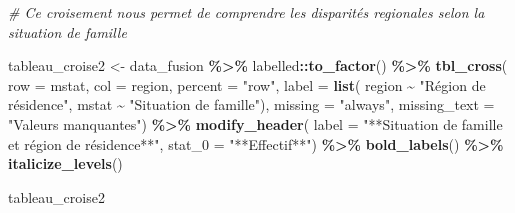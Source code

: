 \documentclass[
]{article}
\newenvironment{Shaded}{\begin{snugshade}}{\end{snugshade}}
\newcommand{\AttributeTok}[1]{\textcolor[rgb]{0.13,0.29,0.53}{#1}}
\newcommand{\CommentTok}[1]{\textcolor[rgb]{0.56,0.35,0.01}{\textit{#1}}}
\newcommand{\FunctionTok}[1]{\textcolor[rgb]{0.13,0.29,0.53}{\textbf{#1}}}
\newcommand{\NormalTok}[1]{#1}
\newcommand{\OtherTok}[1]{\textcolor[rgb]{0.56,0.35,0.01}{#1}}
\newcommand{\SpecialCharTok}[1]{\textcolor[rgb]{0.81,0.36,0.00}{\textbf{#1}}}
\newcommand{\StringTok}[1]{\textcolor[rgb]{0.31,0.60,0.02}{#1}}
\begin{document}
\begin{Shaded}
\begin{Highlighting}[]
\CommentTok{\# Ce croisement nous permet de comprendre les disparités regionales selon la situation de famille}

\NormalTok{tableau\_croise2 }\OtherTok{\textless{}{-}}\NormalTok{ data\_fusion }\SpecialCharTok{\%\textgreater{}\%}
\NormalTok{  labelled}\SpecialCharTok{::}\FunctionTok{to\_factor}\NormalTok{() }\SpecialCharTok{\%\textgreater{}\%}  
  \FunctionTok{tbl\_cross}\NormalTok{(}
    \AttributeTok{row =}\NormalTok{ mstat,  }
    \AttributeTok{col =}\NormalTok{ region,  }
    \AttributeTok{percent =} \StringTok{"row"}\NormalTok{,  }
    \AttributeTok{label =} \FunctionTok{list}\NormalTok{(}
\NormalTok{      region }\SpecialCharTok{\textasciitilde{}} \StringTok{"Région de résidence"}\NormalTok{,  }
\NormalTok{      mstat }\SpecialCharTok{\textasciitilde{}} \StringTok{"Situation de famille"}\NormalTok{),}
    \AttributeTok{missing =} \StringTok{"always"}\NormalTok{,  }
    \AttributeTok{missing\_text =} \StringTok{"Valeurs manquantes"}\NormalTok{) }\SpecialCharTok{\%\textgreater{}\%}
  \FunctionTok{modify\_header}\NormalTok{(}
    \AttributeTok{label =} \StringTok{"**Situation de famille et région de résidence**"}\NormalTok{,}
    \AttributeTok{stat\_0 =} \StringTok{"**Effectif**"}\NormalTok{) }\SpecialCharTok{\%\textgreater{}\%}
  \FunctionTok{bold\_labels}\NormalTok{() }\SpecialCharTok{\%\textgreater{}\%}  
  \FunctionTok{italicize\_levels}\NormalTok{()}

\NormalTok{tableau\_croise2}
\end{Highlighting}
\end{Shaded}
\end{document}
